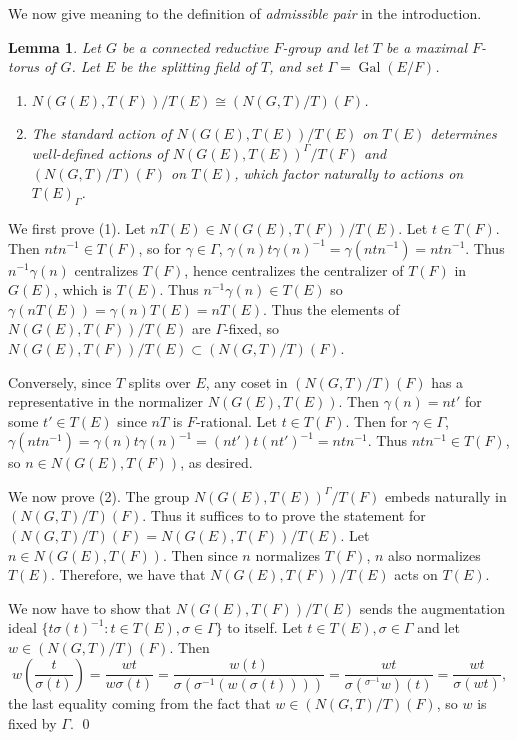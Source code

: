 \documentclass[11pt]{amsart}
\theoremstyle{plain}
\newtheorem{lemma}[theorem]{Lemma}
\theoremstyle{definition}
\DeclareMathOperator{\Gal}{Gal}
\begin{document}
We now give meaning to the definition of \emph{admissible pair} in the introduction.

\begin{lemma}\label{weylgroups}
Let $G$ be a connected reductive $F$-group and let $T$ be a maximal
$F$-torus of $G$.  Let $E$ be the splitting field of $T$, and set
$\Gamma = \Gal(E/F)$.
\begin{enumerate}
\item $N(G(E), T(F)) / T(E) \cong (N(G,T)/T)(F)$.
\item The standard action of $N(G(E),T(E)) / T(E)$ on $T(E)$ determines
well-defined actions of $N(G(E), T(E))^{\Gamma} / T(F)$ and $(N(G,T)/T)(F)$
on $T(E)$, which factor naturally to actions on $T(E)_{\Gamma}$.
\end{enumerate}
\end{lemma}

\proof
We first prove (1).  Let $nT(E)\in N(G(E), T(F)) / T(E)$.  Let $t\in T(F)$.
Then $ntn^{-1}\in T(F)$, so for $\gamma\in\Gamma$,
$\gamma(n)t\gamma(n)^{-1} =  \gamma (ntn^{-1}) = ntn^{-1}$.
Thus $n^{-1}\gamma(n)$ centralizes $T(F)$, hence centralizes the centralizer
of $T(F)$ in $G(E)$, which is $T(E)$. Thus $n^{-1}\gamma(n)\in T(E)$ so
$\gamma(n T(E)) = \gamma (n) T(E) = n T(E)$. Thus the elements of
$N(G(E), T(F)) / T(E)$ are $\Gamma$-fixed, so
$N(G(E), T(F)) / T(E) \subset (N(G,T)/T)(F)$.

Conversely, since $T$ splits over $E$, any coset in $(N(G,T)/T)(F)$
has a representative in the normalizer $N(G(E), T(E))$. Then $\gamma(n) = nt'$
for some $t'\in T(E)$ since $nT$ is $F$-rational.  Let $t\in T(F)$.
Then for $\gamma\in\Gamma$,
$\gamma(ntn^{-1}) = \gamma(n) t \gamma(n)^{-1} = (nt')t(nt')^{-1} = ntn^{-1}$.
Thus $ntn^{-1}\in T(F)$, so $n\in N(G(E),T(F))$, as desired.

We now prove (2).
The group $N(G(E), T(E))^{\Gamma} / T(F)$ embeds naturally in $(N(G,T)/T)(F)$.
Thus it suffices to to prove the statement for
$(N(G,T)/T)(F) = N(G(E), T(F)) / T(E)$.  Let $n \in N(G(E),T(F))$.  Then since $n$
normalizes $T(F)$, $n$ also normalizes $T(E)$.  Therefore, we have that
$N(G(E), T(F)) / T(E)$ acts on $T(E)$.

We now have to show that $N(G(E), T(F)) / T(E)$
sends the augmentation ideal
$\{ t\sigma(t)^{-1} : t \in T(E), \sigma \in \Gamma \}$ to itself.
Let $t \in T(E), \sigma \in \Gamma$ and let $w \in  (N(G,T)/T)(F)$.  Then $$w\left(\frac{t}{\sigma(t)}\right)
= \frac{wt}{w \sigma(t)} = \frac{w(t)}{\sigma (\sigma^{-1}(w(\sigma(t))))} =
\frac{wt}{\sigma ({}^{\sigma^{-1}} w) (t)} = \frac{wt}{\sigma(wt)},$$
the last equality coming from the fact that $w \in (N(G,T)/T)(F)$, so $w$
is fixed by $\Gamma$.
\qed
\end{document}
